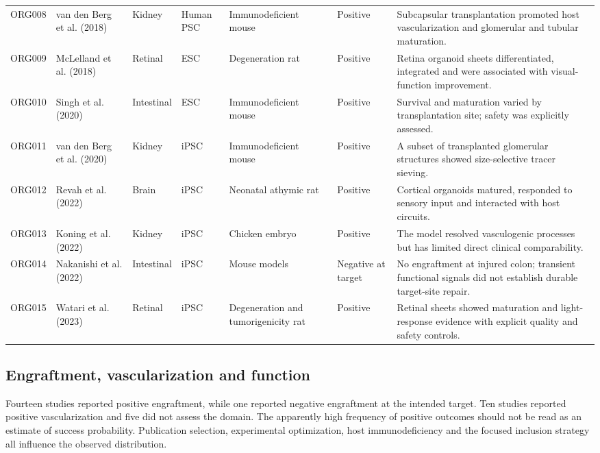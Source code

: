 \documentclass[11pt,a4paper]{article}
\begin{document}
\begin{landscape}
\begin{longtable}{@{}P{12mm}P{27mm}P{18mm}P{32mm}P{24mm}P{25mm}P{78mm}@{}}
ORG008 & van den Berg et al. (2018) \citep{vandenberg2018} & Kidney & Human PSC & Immunodeficient mouse & Positive & Subcapsular transplantation promoted host vascularization and glomerular and tubular maturation.\\
ORG009 & McLelland et al. (2018) \citep{mclelland2018} & Retinal & ESC & Degeneration rat & Positive & Retina organoid sheets differentiated, integrated and were associated with visual-function improvement.\\
ORG010 & Singh et al. (2020) \citep{singh2020} & Intestinal & ESC & Immunodeficient mouse & Positive & Survival and maturation varied by transplantation site; safety was explicitly assessed.\\
ORG011 & van den Berg et al. (2020) \citep{vandenberg2020} & Kidney & iPSC & Immunodeficient mouse & Positive & A subset of transplanted glomerular structures showed size-selective tracer sieving.\\
ORG012 & Revah et al. (2022) \citep{revah2022} & Brain & iPSC & Neonatal athymic rat & Positive & Cortical organoids matured, responded to sensory input and interacted with host circuits.\\
ORG013 & Koning et al. (2022) \citep{koning2022} & Kidney & iPSC & Chicken embryo & Positive & The model resolved vasculogenic processes but has limited direct clinical comparability.\\
ORG014 & Nakanishi et al. (2022) \citep{nakanishi2022} & Intestinal & iPSC & Mouse models & Negative at target & No engraftment at injured colon; transient functional signals did not establish durable target-site repair.\\
ORG015 & Watari et al. (2023) \citep{watari2023} & Retinal & iPSC & Degeneration and tumorigenicity rat & Positive & Retinal sheets showed maturation and light-response evidence with explicit quality and safety controls.\\
\end{longtable}
\end{landscape}

\subsection{Engraftment, vascularization and function}

Fourteen studies reported positive engraftment, while one reported negative engraftment at the intended target. Ten studies reported positive vascularization and five did not assess the domain. The apparently high frequency of positive outcomes should not be read as an estimate of success probability. Publication selection, experimental optimization, host immunodeficiency and the focused inclusion strategy all influence the observed distribution.
\end{document}
